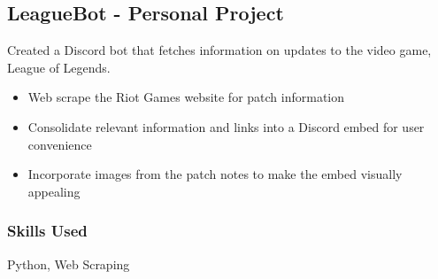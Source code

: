\documentclass[11pt, letterpaper]{article}
\begin{document}
        \subsection{LeagueBot - Personal Project}
            Created a Discord bot that fetches information on updates to the video game, League 
            of Legends.
            \begin{itemize}[nosep]
                \item Web scrape the Riot Games website for patch information
                \item Consolidate relevant information and links into a Discord embed for user convenience
                \item Incorporate images from the patch notes to make the embed visually appealing
            \end{itemize}
            \subsubsection{Skills Used}
                Python, Web Scraping
\end{document}
